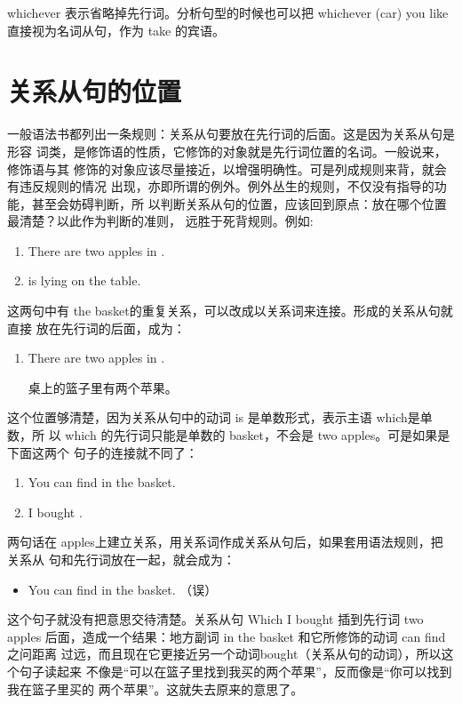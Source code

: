 whichever 表示省略掉先行词。分析句型的时候也可以把 whichever (car) you like
直接视为名词从句，作为 take 的宾语。

\section{关系从句的位置}

一般语法书都列出一条规则：关系从句要放在先行词的后面。这是因为关系从句是形容
词类，是修饰语的性质，它修饰的对象就是先行词位置的名词。一般说来，修饰语与其
修饰的对象应该尽量接近，以增强明确性。可是列成规则来背，就会有违反规则的情况
出现，亦即所谓的例外。例外丛生的规则，不仅没有指导的功能，甚至会妨碍判断，所
以判断关系从句的位置，应该回到原点：放在哪个位置最清楚？以此作为判断的准则，
远胜于死背规则。例如:

\begin{enumerate}
\item There are two apples in .
\item {} is lying on the table.
\end{enumerate}
这两句中有 the basket的重复关系，可以改成以关系词来连接。形成的关系从句就直接
放在先行词的后面，成为：
\begin{enumerate}[resume]
\item There are two apples in  .

  桌上的篮子里有两个苹果。
\end{enumerate}
这个位置够清楚，因为关系从句中的动词 is 是单数形式，表示主语 which是单数，所
以 which 的先行词只能是单数的 basket，不会是 two apples。可是如果是下面这两个
句子的连接就不同了：
\begin{enumerate}
\item You can find  in the basket.
\item I bought .
\end{enumerate}

两句话在 apples上建立关系，用关系词作成关系从句后，如果套用语法规则，把关系从
句和先行词放在一起，就会成为：
\begin{itemize}
\item You can find 
   in the basket. （误）
\end{itemize}
这个句子就没有把意思交待清楚。关系从句 Which I bought 插到先行词 two apples
后面，造成一个结果：地方副词 in the basket 和它所修饰的动词 can find 之问距离
过远，而且现在它更接近另一个动词bought（关系从句的动词），所以这个句子读起来
不像是“可以在篮子里找到我买的两个苹果”，反而像是“你可以找到我在篮子里买的
两个苹果”。这就失去原来的意思了。

